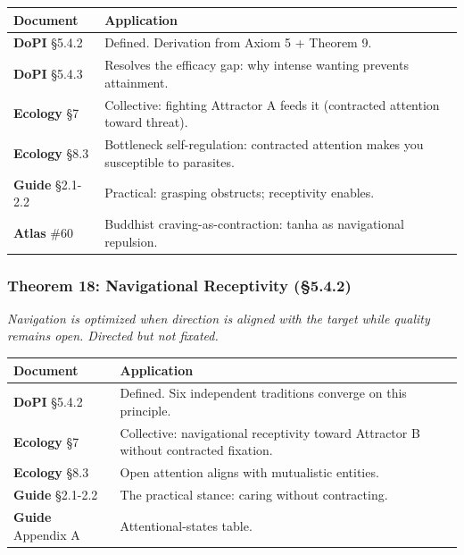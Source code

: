 \begin{longtable}{>{\raggedright\arraybackslash}p{} >{\raggedright\arraybackslash}p{}}
\toprule
\textbf{Document} & \textbf{Application} \\
\midrule
\endhead
\textbf{DoPI} §5.4.2 & Defined. Derivation from Axiom 5 + Theorem 9. \\
\textbf{DoPI} §5.4.3 & Resolves the efficacy gap: why intense wanting prevents attainment. \\
\textbf{Ecology} §7 & Collective: fighting Attractor A feeds it (contracted attention toward threat). \\
\textbf{Ecology} §8.3 & Bottleneck self-regulation: contracted attention makes you susceptible to parasites. \\
\textbf{Guide} §2.1-2.2 & Practical: grasping obstructs; receptivity enables. \\
\textbf{Atlas} \#60 & Buddhist craving-as-contraction: tanha as navigational repulsion. \\
\bottomrule
\end{longtable}



\subsubsection*{Theorem 18: Navigational Receptivity (§5.4.2)}


\textit{Navigation is optimized when direction is aligned with the target while quality remains open. Directed but not fixated.}



\begin{longtable}{>{\raggedright\arraybackslash}p{} >{\raggedright\arraybackslash}p{}}
\toprule
\textbf{Document} & \textbf{Application} \\
\midrule
\endhead
\textbf{DoPI} §5.4.2 & Defined. Six independent traditions converge on this principle. \\
\textbf{Ecology} §7 & Collective: navigational receptivity toward Attractor B without contracted fixation. \\
\textbf{Ecology} §8.3 & Open attention aligns with mutualistic entities. \\
\textbf{Guide} §2.1-2.2 & The practical stance: caring without contracting. \\
\textbf{Guide} Appendix A & Attentional-states table. \\
\bottomrule
\end{longtable}




